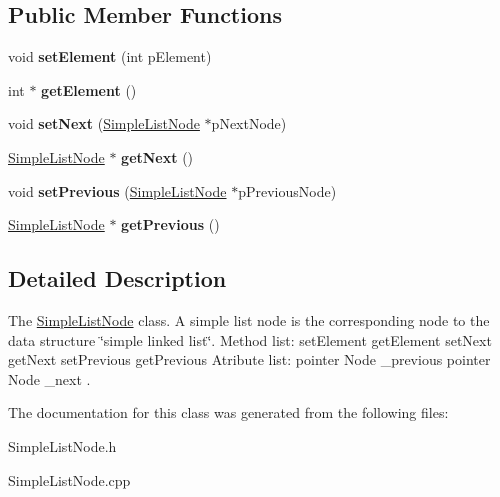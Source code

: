 \subsection*{Public Member Functions}
\begin{DoxyCompactItemize}
\item 
\hypertarget{classSimpleListNode_ad88ea222aee07a6f8b1113c92aa7b069}{void {\bfseries set\-Element} (int p\-Element)}\label{classSimpleListNode_ad88ea222aee07a6f8b1113c92aa7b069}

\item 
\hypertarget{classSimpleListNode_a79a2c3e4610352b4b24de421df8a451d}{int $\ast$ {\bfseries get\-Element} ()}\label{classSimpleListNode_a79a2c3e4610352b4b24de421df8a451d}

\item 
\hypertarget{classSimpleListNode_af36eceb9c6e6cc0d471844d6a952f6cf}{void {\bfseries set\-Next} (\hyperlink{classSimpleListNode}{Simple\-List\-Node} $\ast$p\-Next\-Node)}\label{classSimpleListNode_af36eceb9c6e6cc0d471844d6a952f6cf}

\item 
\hypertarget{classSimpleListNode_a2f2aaa5011673d032ac0e385dc2a4032}{\hyperlink{classSimpleListNode}{Simple\-List\-Node} $\ast$ {\bfseries get\-Next} ()}\label{classSimpleListNode_a2f2aaa5011673d032ac0e385dc2a4032}

\item 
\hypertarget{classSimpleListNode_acebffab49dae4768f695054b0ccff68a}{void {\bfseries set\-Previous} (\hyperlink{classSimpleListNode}{Simple\-List\-Node} $\ast$p\-Previous\-Node)}\label{classSimpleListNode_acebffab49dae4768f695054b0ccff68a}

\item 
\hypertarget{classSimpleListNode_ac4bead7a1bd4e896f8a8e7a8a53cbc3d}{\hyperlink{classSimpleListNode}{Simple\-List\-Node} $\ast$ {\bfseries get\-Previous} ()}\label{classSimpleListNode_ac4bead7a1bd4e896f8a8e7a8a53cbc3d}

\end{DoxyCompactItemize}


\subsection{Detailed Description}
The \hyperlink{classSimpleListNode}{Simple\-List\-Node} class. A simple list node is the corresponding node to the data structure \char`\"{}simple linked list\char`\"{}. Method list\-:   set\-Element  get\-Element  set\-Next  get\-Next  set\-Previous  get\-Previous  Atribute list\-:   pointer Node \-\_\-previous  pointer Node \-\_\-next . 

The documentation for this class was generated from the following files\-:\begin{DoxyCompactItemize}
\item 
Simple\-List\-Node.\-h\item 
Simple\-List\-Node.\-cpp\end{DoxyCompactItemize}
